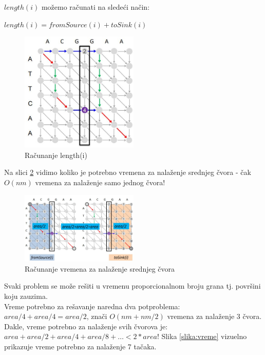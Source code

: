 $length(i)$ možemo računati na sledeći način:
\begin{center}
$length(i) = fromSource(i) + toSink(i)$
\end{center}

\begin{figure}[h!]
\centering
\includegraphics[width=0.5\textwidth]{poglavlja/5/slike/i_putanje.JPG}
\caption{Računanje length(i)}
\label{slika:iputanja}
\end{figure}

Na slici \ref{slika:sourceSink} vidimo koliko je potrebno vremena za nalaženje srednjeg čvora - čak $O(nm)$ vremena za nalaženje samo jednog čvora! 
\begin{figure}[h!]
\centering
\includegraphics[width=0.5\textwidth]{poglavlja/5/slike/sourceSink.JPG}
\caption{Računanje vremena za nalaženje srednjeg čvora}
\label{slika:sourceSink}
\end{figure}

Svaki problem se može rešiti u vremenu proporcionalnom broju grana tj. površini koju zauzima. \\
Vreme potrebno za rešavanje naredna dva potproblema: $area/4 + area/4 = area/2$, znači  $O(nm + nm/2)$ vremena za nalaženje 3 čvora. \\
Dakle, vreme potrebno za nalaženje svih čvorova je: $area + area/2 + area/4 + area/8 + \dots < 2 * area$! Slika \ref{slika:vreme} vizuelno prikazuje vreme potrebno za nalaženje 7 tačaka. \\

